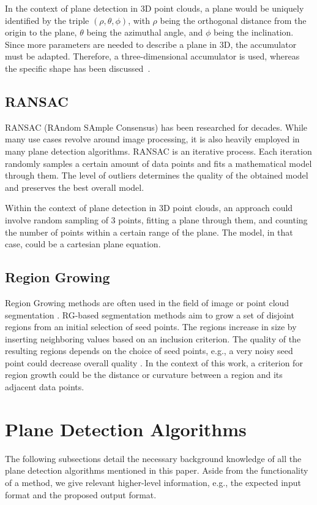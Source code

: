 \documentclass[main.tex]{subfiles}
\begin{document}
In the context of plane detection in 3D point clouds, a plane would be uniquely identified by the triple $(\rho, \theta, \phi)$, with $\rho$ being the orthogonal distance from the origin to the plane, $\theta$ being the azimuthal angle, and $\phi$ being the inclination.
Since more parameters are needed to describe a plane in 3D, the accumulator must be adapted.
Therefore, a three-dimensional accumulator is used, whereas the specific shape has been discussed~\cite*{Borrmann_Elseberg_Lingemann_Nüchter_2011}.

\subsection*{RANSAC}
RANSAC (RAndom SAmple Consensus) has been researched for decades. While many use cases revolve around image processing, it is also heavily employed in many plane detection algorithms\cite{Sun_Mordohai_2019, Yang_Forstner, Ashraf_Ahmed_2017}.
RANSAC is an iterative process. Each iteration randomly samples a certain amount of data points and fits a mathematical model through them. The level of outliers determines the quality of the obtained model and preserves the best overall model.

Within the context of plane detection in 3D point clouds, an approach could involve random sampling of 3 points, fitting a plane through them,
and counting the number of points within a certain range of the plane\cite{Yang_Forstner}. The model, in that case, could be a cartesian plane equation.

\subsection*{Region Growing}
Region Growing methods are often used in the field of image or point cloud segmentation \cite{Proença_Gao_2018, Vo_Truong-Hong_Laefer_Bertolotto_2015}.
RG-based segmentation methods aim to grow a set of disjoint regions from an initial selection of seed points. The regions increase in size by inserting neighboring values based on an inclusion criterion.
The quality of the resulting regions depends on the choice of seed points, e.g., a very noisy seed point could decrease overall quality  \cite{Malek_Rahman_Yasiran_Jumaat_Jalil_2012}.
In the context of this work, a criterion for region growth could be the distance or curvature between a region and its adjacent data points.

\section{Plane Detection Algorithms}
The following subsections detail the necessary background knowledge of all the plane detection algorithms mentioned in this paper.
Aside from the functionality of a method, we give relevant higher-level information, e.g., the expected input format and the proposed output format.
\end{document}
